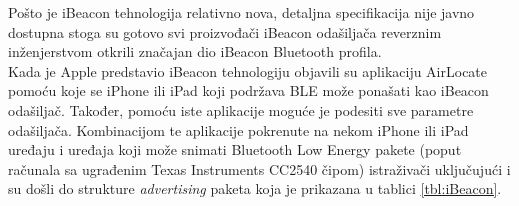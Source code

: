 Pošto je iBeacon tehnologija relativno nova, detaljna specifikacija nije javno dostupna stoga su gotovo svi proizvođači iBeacon odašiljača reverznim inženjerstvom otkrili značajan dio iBeacon Bluetooth profila.
\\
Kada je Apple predstavio iBeacon tehnologiju objavili su aplikaciju AirLocate pomoću koje se iPhone ili iPad koji podržava BLE može ponašati kao iBeacon odašiljač. 
Također, pomoću iste aplikacije moguće je podesiti sve parametre odašiljača. 
Kombinacijom te aplikacije pokrenute na nekom iPhone ili iPad uređaju i uređaja koji može snimati Bluetooth Low Energy pakete (poput računala sa ugrađenim Texas Instruments CC2540 čipom) istraživači uključujući i \citep
{radiusReverseEng} su došli do strukture \textit{advertising} paketa koja je prikazana u tablici \ref{tbl:iBeacon}.

